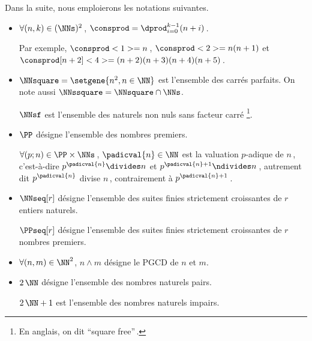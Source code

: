 Dans la suite, nous emploierons les notations suivantes.

\begin{itemize}
	\item $\forall (n, k) \in ( \NNs )^2$\,, $\consprod = \dprod_{i = 0}^{k - 1} (n + i)$\,. 
	
	\noindent
	Par exemple,
	$\consprod<1> = n$\,,
	$\consprod<2> = n (n+1)$
	et
	$\consprod[n+2]<4> = (n+2) (n+3) (n+4) (n+5)$\,.


	\medskip
	\item $\NNsquare = \setgene{n^2, n \in \NN}$ est l'ensemble des carrés parfaits.
	On note aussi $\NNssquare = \NNsquare \cap \NNs$.

	\noindent
	$\NNsf$ est l'ensemble des naturels non nuls sans facteur carré
	\footnote{
		En anglais, on dit \enquote{square free}\,.
	}.


	\medskip
	\item $\PP$ désigne l'ensemble des nombres premiers.
	
	\noindent
	$\forall (p ; n) \in \PP \times \NNs$\,, $\padicval{n} \in \NN$ est la valuation $p$-adique de $n$\,,
	c'est-à-dire 
	$p^{\padicval{n}} \divides n$ et $p^{\padicval{n} + 1} \ndivides n$\,,
	autrement dit
	$p^{\padicval{n}}$ divise $n$\,, contrairement à $p^{\padicval{n} + 1}$\,.


	\medskip
	\item $\NNseq[r]$ désigne l'ensemble des suites finies strictement croissantes de $r$ entiers naturels.
	
	
	\noindent
	$\PPseq[r]$ désigne l'ensemble des suites finies strictement croissantes de $r$ nombres premiers.


	\medskip
	\item $\forall (n , m) \in \NN^2$, $n \wedge m$ désigne le PGCD de $n$ et $m$.

	
	\medskip
	\item $2\,\NN$ désigne l'ensemble des nombres naturels pairs.
	
	\noindent
	$2\,\NN + 1$ est l'ensemble des nombres naturels impairs.
\end{itemize}